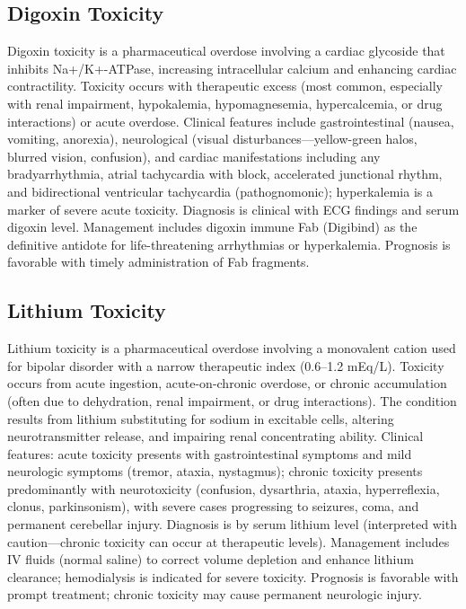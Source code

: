 \subsection{Digoxin Toxicity}
\label{sec:Digoxin Toxicity}
Digoxin toxicity is a pharmaceutical overdose involving a cardiac glycoside that inhibits Na+/K+-ATPase, increasing intracellular calcium and enhancing cardiac contractility. Toxicity occurs with therapeutic excess (most common, especially with renal impairment, hypokalemia, hypomagnesemia, hypercalcemia, or drug interactions) or acute overdose. Clinical features include gastrointestinal (nausea, vomiting, anorexia), neurological (visual disturbances---yellow-green halos, blurred vision, confusion), and cardiac manifestations including any bradyarrhythmia, atrial tachycardia with block, accelerated junctional rhythm, and bidirectional ventricular tachycardia (pathognomonic); hyperkalemia is a marker of severe acute toxicity. Diagnosis is clinical with ECG findings and serum digoxin level. Management includes digoxin immune Fab (Digibind) as the definitive antidote for life-threatening arrhythmias or hyperkalemia. Prognosis is favorable with timely administration of Fab fragments.

\subsection{Lithium Toxicity}
\label{sec:Lithium Toxicity}
Lithium toxicity is a pharmaceutical overdose involving a monovalent cation used for bipolar disorder with a narrow therapeutic index (0.6--1.2 mEq/L). Toxicity occurs from acute ingestion, acute-on-chronic overdose, or chronic accumulation (often due to dehydration, renal impairment, or drug interactions). The condition results from lithium substituting for sodium in excitable cells, altering neurotransmitter release, and impairing renal concentrating ability. Clinical features: acute toxicity presents with gastrointestinal symptoms and mild neurologic symptoms (tremor, ataxia, nystagmus); chronic toxicity presents predominantly with neurotoxicity (confusion, dysarthria, ataxia, hyperreflexia, clonus, parkinsonism), with severe cases progressing to seizures, coma, and permanent cerebellar injury. Diagnosis is by serum lithium level (interpreted with caution---chronic toxicity can occur at therapeutic levels). Management includes IV fluids (normal saline) to correct volume depletion and enhance lithium clearance; hemodialysis is indicated for severe toxicity. Prognosis is favorable with prompt treatment; chronic toxicity may cause permanent neurologic injury.

